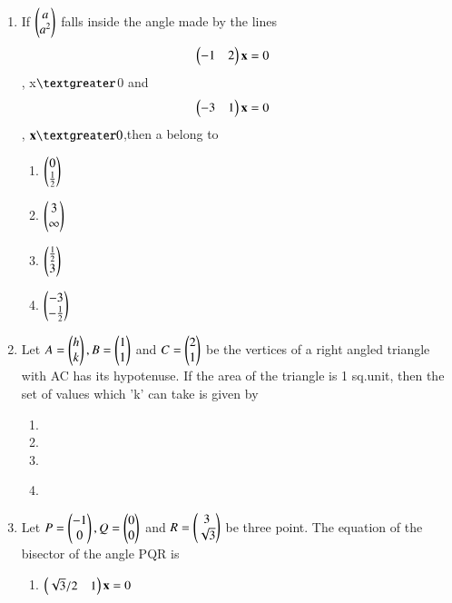 \begin{enumerate}
\begin{enumerate}
     \end{enumerate}
    \item If $\begin{pmatrix}a\\a^2\end{pmatrix}$ falls inside the angle made by the lines \begin{align}\begin{pmatrix}-1 & 2\end{pmatrix} \mathbf {x} &= 0\end{align}, x$\textgreater$0 and \begin{align}\begin{pmatrix}-3 & 1\end{pmatrix} \mathbf {x} &= 0\end{align}, $\vec {x} \textgreater 0$,then a belong to
    \begin{enumerate}
     \item  $\begin{pmatrix}0\\\frac{1}{2}\end{pmatrix}$
     \item  $\begin{pmatrix}3\\\infty\end{pmatrix}$
     \item  $\begin{pmatrix}\frac{1}{2}\\3\end{pmatrix}$
     \item  $\begin{pmatrix}-3\\-\frac{1}{2}\end{pmatrix}$
     \end{enumerate}
    \item Let $A=\begin{pmatrix}h\\k\end{pmatrix}, B=\begin{pmatrix}1\\1\end{pmatrix}$ and  $C=\begin{pmatrix}2\\1\end{pmatrix}$ be the vertices of a right angled triangle with AC has its hypotenuse. If the area of the triangle is 1 sq.unit, then the set of values which 'k' can take is given by\\
    \begin{enumerate}
     \item  {}
     \item  {}
     \item  {}
     \item  {}\\
     \end{enumerate}
    \item Let $P=\begin{pmatrix}-1\\0\end{pmatrix}, Q=\begin{pmatrix}0\\0\end{pmatrix}$ and $R=\begin{pmatrix}3\\\sqrt3\end{pmatrix}$ be three point. The equation of the bisector of the angle PQR is\\ 
    \begin{enumerate}
     \item  $\begin{pmatrix}\sqrt3/2 & 1\end{pmatrix} \mathbf {x} = 0$

\end{enumerate}
\end{enumerate}
